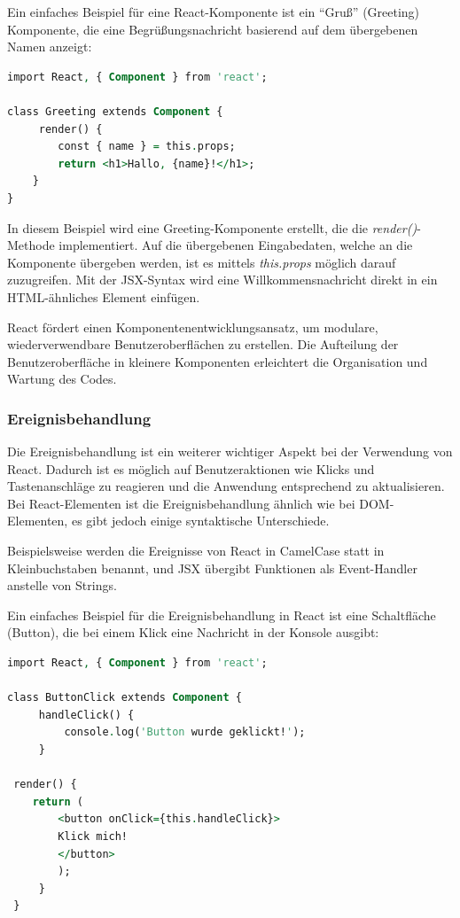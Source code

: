 Ein einfaches Beispiel für eine React-Komponente ist ein "`Gruß"' (Greeting) Komponente, die eine Begrüßungsnachricht basierend auf dem übergebenen Namen anzeigt:
\begin{lstlisting}[language=vhdl,
	frame=single,           % Ein Rahmen um den Code
	framexleftmargin=15pt,  % Rahmen link von den Zahlen
	style=algoBericht,
	label={Greeting-Komponente},
	captionpos=b ,          % Caption unter den Code setzen
	caption={Beispiel Komponentenentwicklung }]
import React, { Component } from 'react';

class Greeting extends Component {
     render() {
        const { name } = this.props;
        return <h1>Hallo, {name}!</h1>;
    }
}
\end{lstlisting}
In diesem Beispiel wird eine Greeting-Komponente erstellt, die die \emph{render()}-Methode implementiert. Auf die übergebenen Eingabedaten, welche an die Komponente übergeben werden, ist es mittels \emph{this.props} möglich darauf zuzugreifen\cite{deLegacyReactjs}. Mit der JSX-Syntax wird eine Willkommensnachricht direkt in ein HTML-ähnliches Element einfügen.

React fördert einen Komponentenentwicklungsansatz, um modulare, wiederverwendbare Benutzeroberflächen zu erstellen. Die Aufteilung der Benutzeroberfläche in kleinere Komponenten erleichtert die Organisation und Wartung des Codes.

\subsubsection{Ereignisbehandlung}
Die Ereignisbehandlung ist ein weiterer wichtiger Aspekt bei der Verwendung von React. Dadurch ist es möglich auf Benutzeraktionen wie Klicks und Tastenanschläge zu reagieren und die Anwendung entsprechend zu aktualisieren. Bei React-Elementen ist die Ereignisbehandlung ähnlich wie bei DOM-Elementen, es gibt jedoch einige syntaktische Unterschiede.

Beispielsweise werden die Ereignisse von React in CamelCase statt in Kleinbuchstaben benannt, und JSX übergibt Funktionen als Event-Handler anstelle von Strings.\cite{react_de_handling_events}

Ein einfaches Beispiel für die Ereignisbehandlung in React ist eine Schaltfläche (Button), die bei einem Klick eine Nachricht in der Konsole ausgibt:

\begin{lstlisting}[language=vhdl,
	frame=single,           % Ein Rahmen um den Code
	framexleftmargin=15pt,  % Rahmen link von den Zahlen
	style=algoBericht,
	label={Events},
	captionpos=b ,          % Caption unter den Code setzen
	caption={Beispiel EventHandler}]
import React, { Component } from 'react';

class ButtonClick extends Component {
     handleClick() {
         console.log('Button wurde geklickt!');
     }
 
 render() {
 	return (
 	    <button onClick={this.handleClick}>
 	    Klick mich!
 	    </button>
 	    );
     }
 }

\end{lstlisting}

